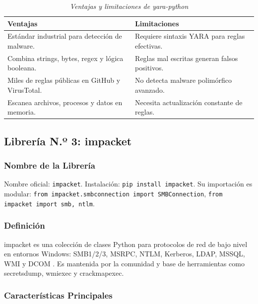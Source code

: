 \documentclass[12pt,a4paper]{article}
\begin{document}
\begin{table}[H]
\centering
\begin{threeparttable}
\caption{\textit{Ventajas y limitaciones de yara-python}}
\begin{tabular}{p{6.5cm}p{6.5cm}}
\toprule
\textbf{Ventajas} & \textbf{Limitaciones} \\
\midrule
Estándar industrial para detección de malware. & Requiere sintaxis YARA para reglas efectivas. \\
Combina strings, bytes, regex y lógica booleana. & Reglas mal escritas generan falsos positivos. \\
Miles de reglas públicas en GitHub y VirusTotal. & No detecta malware polimórfico avanzado. \\
Escanea archivos, procesos y datos en memoria. & Necesita actualización constante de reglas. \\
\bottomrule
\end{tabular}
\end{threeparttable}
\end{table}

\subsection{Librería N.º 3: impacket}

\subsubsection{Nombre de la Librería}

Nombre oficial: \texttt{impacket}. Instalación: \texttt{pip install impacket}.
Su importación es modular: \texttt{from impacket.smbconnection import
SMBConnection}, \texttt{from impacket import smb, ntlm}.

\subsubsection{Definición}

impacket es una colección de clases Python para protocolos de red de
bajo nivel en entornos Windows: SMB1/2/3, MSRPC, NTLM, Kerberos, LDAP,
MSSQL, WMI y DCOM \cite{fortra2024}. Es mantenida por la comunidad y base
de herramientas como secretsdump, wmiexec y crackmapexec.

\subsubsection{Características Principales}
\end{document}
